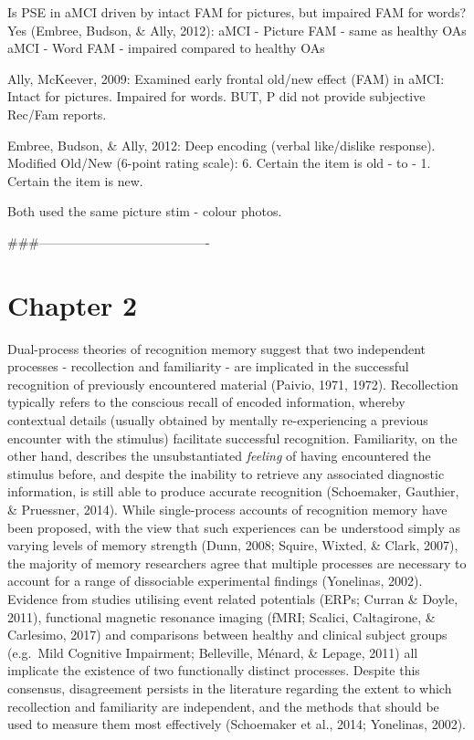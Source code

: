 \documentclass[
  11pt,
]{article}
\begin{document}
Is PSE in aMCI driven by intact FAM for pictures, but impaired FAM for
words? Yes (Embree, Budson, \& Ally, 2012): aMCI - Picture FAM - same as
healthy OAs aMCI - Word FAM - impaired compared to healthy OAs

Ally, McKeever, 2009: Examined early frontal old/new effect (FAM) in
aMCI: Intact for pictures. Impaired for words. BUT, P did not provide
subjective Rec/Fam reports.

Embree, Budson, \& Ally, 2012: Deep encoding (verbal like/dislike
response). Modified Old/New (6-point rating scale): 6. Certain the item
is old - to - 1. Certain the item is new.

Both used the same picture stim - colour photos.

\#\#\#----------------------------------------

\newpage

\hypertarget{chapter-2-1}{%
\section{Chapter 2}\label{chapter-2-1}}

Dual-process theories of recognition memory suggest that two independent
processes - recollection and familiarity - are implicated in the
successful recognition of previously encountered material (Paivio, 1971,
1972). Recollection typically refers to the conscious recall of encoded
information, whereby contextual details (usually obtained by mentally
re-experiencing a previous encounter with the stimulus) facilitate
successful recognition. Familiarity, on the other hand, describes the
unsubstantiated \emph{feeling} of having encountered the stimulus
before, and despite the inability to retrieve any associated diagnostic
information, is still able to produce accurate recognition (Schoemaker,
Gauthier, \& Pruessner, 2014). While single-process accounts of
recognition memory have been proposed, with the view that such
experiences can be understood simply as varying levels of memory
strength (Dunn, 2008; Squire, Wixted, \& Clark, 2007), the majority of
memory researchers agree that multiple processes are necessary to
account for a range of dissociable experimental findings (Yonelinas,
2002). Evidence from studies utilising event related potentials (ERPs;
Curran \& Doyle, 2011), functional magnetic resonance imaging (fMRI;
Scalici, Caltagirone, \& Carlesimo, 2017) and comparisons between
healthy and clinical subject groups (e.g.~Mild Cognitive Impairment;
Belleville, Ménard, \& Lepage, 2011) all implicate the existence of two
functionally distinct processes. Despite this consensus, disagreement
persists in the literature regarding the extent to which recollection
and familiarity are independent, and the methods that should be used to
measure them most effectively (Schoemaker et al., 2014; Yonelinas,
2002).
\end{document}
